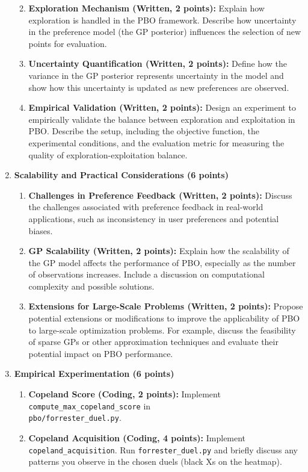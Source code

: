 \documentclass[
  letterpaper,
  numbers=noenddot,
  DIV=11]{scrreprt}
\theoremstyle{definition}
\theoremstyle{plain}
\theoremstyle{plain}
\theoremstyle{remark}
\begin{document}
\begin{enumerate}
  \begin{enumerate}
  \def\labelenumii{(\roman{enumii})}
  \item
    \textbf{Exploration Mechanism (Written, 2 points):} Explain how
    exploration is handled in the PBO framework. Describe how
    uncertainty in the preference model (the GP posterior) influences
    the selection of new points for evaluation.
  \item
    \textbf{Uncertainty Quantification (Written, 2 points):} Define how
    the variance in the GP posterior represents uncertainty in the model
    and show how this uncertainty is updated as new preferences are
    observed.
  \item
    \textbf{Empirical Validation (Written, 2 points):} Design an
    experiment to empirically validate the balance between exploration
    and exploitation in PBO. Describe the setup, including the objective
    function, the experimental conditions, and the evaluation metric for
    measuring the quality of exploration-exploitation balance.
  \end{enumerate}
\item
  \textbf{Scalability and Practical Considerations (6 points)}

  \begin{enumerate}
  \def\labelenumii{(\roman{enumii})}
  \item
    \textbf{Challenges in Preference Feedback (Written, 2 points):}
    Discuss the challenges associated with preference feedback in
    real-world applications, such as inconsistency in user preferences
    and potential biases.
  \item
    \textbf{GP Scalability (Written, 2 points):} Explain how the
    scalability of the GP model affects the performance of PBO,
    especially as the number of observations increases. Include a
    discussion on computational complexity and possible solutions.
  \item
    \textbf{Extensions for Large-Scale Problems (Written, 2 points):}
    Propose potential extensions or modifications to improve the
    applicability of PBO to large-scale optimization problems. For
    example, discuss the feasibility of sparse GPs or other
    approximation techniques and evaluate their potential impact on PBO
    performance.
  \end{enumerate}
\item
  \textbf{Empirical Experimentation (6 points)}

  \begin{enumerate}
  \def\labelenumii{(\roman{enumii})}
  \item
    \textbf{Copeland Score (Coding, 2 points):} Implement
    \texttt{compute\_max\_copeland\_score} in\\
    \texttt{pbo/forrester\_duel.py}.
  \item
    \textbf{Copeland Acquisition (Coding, 4 points):} Implement
    \texttt{copeland\_acquisition}. Run \texttt{forrester\_duel.py} and
    briefly discuss any patterns you observe in the chosen duels (black
    Xs on the heatmap).
  \end{enumerate}
\end{enumerate}
\end{document}
